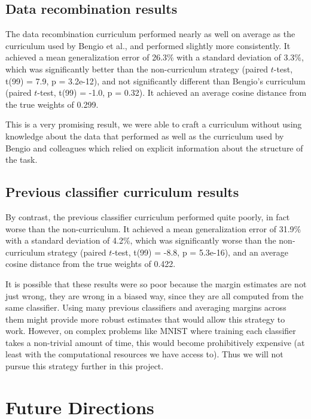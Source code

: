 \documentclass[11pt]{article}
\begin{document}
\subsection{Data recombination results}
The data recombination curriculum performed nearly as well on average as the curriculum used by Bengio et al., and performed slightly more consistently. It achieved a mean generalization error of 26.3\% with a standard deviation of 3.3\%, which was significantly better than the non-curriculum strategy (paired $t$-test, t(99) = 7.9, p = 3.2e-12), and not significantly different than Bengio's curriculum (paired $t$-test, t(99) = -1.0, p = 0.32). It achieved an average cosine distance from the true weights of 0.299.\par
This is a very promising result, we were able to craft a curriculum without using knowledge about the data that performed as well as the curriculum used by Bengio and colleagues which relied on explicit information about the structure of the task.
\subsection{Previous classifier curriculum results}
By contrast, the previous classifier curriculum performed quite poorly, in fact worse than the non-curriculum. It achieved a mean generalization error of 31.9\% with a standard deviation of 4.2\%, which was significantly worse than the non-curriculum strategy (paired $t$-test, t(99) = -8.8, p = 5.3e-16), and an average cosine distance from the true weights of 0.422.\par
It is possible that these results were so poor because the margin estimates are not just wrong, they are wrong in a biased way, since they are all computed from the same classifier. Using many previous classifiers and averaging margins across them might provide more robust estimates that would allow this strategy to work. However, on complex problems like MNIST where training each classifier takes a non-trivial amount of time, this would become prohibitively expensive (at least with the computational resources we have access to). Thus we will not pursue this strategy further in this project.
\section{Future Directions}
\end{document}
